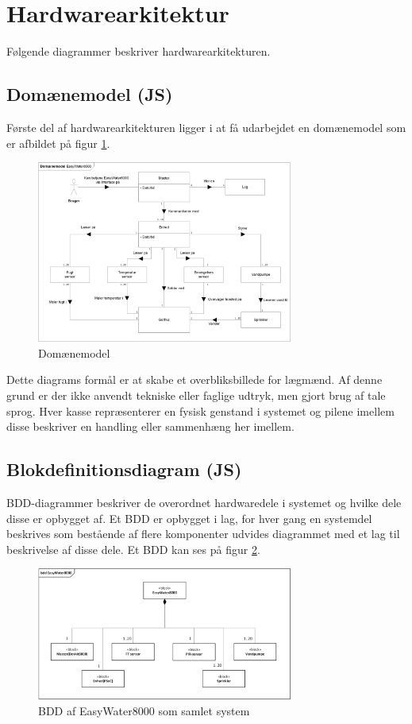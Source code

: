 \section{Hardwarearkitektur}
Følgende diagrammer beskriver hardwarearkitekturen.

\subsection{Domænemodel (JS)}
Første del af hardwarearkitekturen ligger i at få udarbejdet en domænemodel som er afbildet	 på figur \ref{lab:Domainmodel}.

\begin{figure}[H]
  \centering
    \includegraphics[width=0.75\textwidth]{Billeder/Domainmodel}
    \caption{Domænemodel}
    \label{lab:Domainmodel}
\end{figure}

Dette diagrams formål er at skabe et overbliksbillede for lægmænd. Af denne grund er der ikke anvendt tekniske eller faglige udtryk, men gjort brug af tale sprog. Hver kasse repræsenterer en fysisk genstand i systemet og pilene imellem disse beskriver en handling eller sammenhæng her imellem.

\subsection{Blokdefinitionsdiagram (JS)}
BDD-diagrammer beskriver de overordnet hardwaredele i systemet og hvilke dele disse er opbygget af. Et BDD er opbygget i lag, for hver gang en systemdel beskrives som bestående af flere komponenter udvides diagrammet med et lag til beskrivelse af disse dele. Et BDD kan ses på figur \ref{lab:BDD}. 

\begin{figure}[H]
  \centering
    \includegraphics[width=0.75\textwidth]{Billeder/BDD}
    \caption{BDD af EasyWater8000 som samlet system}
    \label{lab:BDD}
\end{figure}

